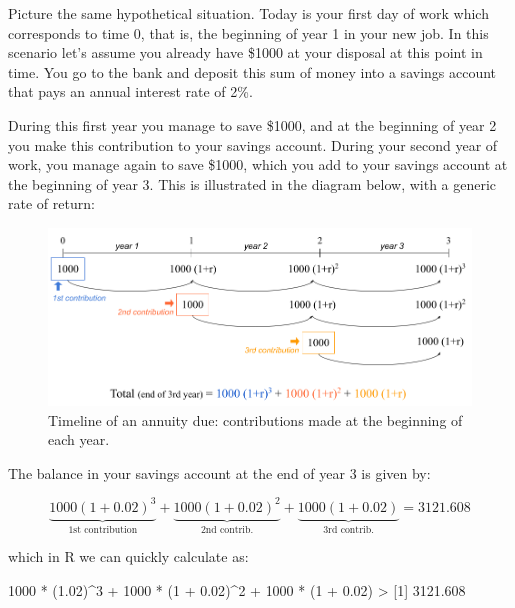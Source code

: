 \documentclass[
]{book}
\newenvironment{Shaded}{\begin{snugshade}}{\end{snugshade}}
\newcommand{\DecValTok}[1]{\textcolor[rgb]{0.00,0.00,0.81}{#1}}
\newcommand{\FloatTok}[1]{\textcolor[rgb]{0.00,0.00,0.81}{#1}}
\newcommand{\NormalTok}[1]{#1}
\newcommand{\SpecialCharTok}[1]{\textcolor[rgb]{0.00,0.00,0.00}{#1}}
\begin{document}
Picture the same hypothetical situation. Today is your first day of work
which corresponds to time 0, that is, the beginning of year 1 in your new job.
In this scenario let's assume you already have \$1000 at your disposal
at this point in time. You go to the bank and deposit this sum of money into a
savings account that pays an annual interest rate of 2\%.

During this first year you manage to save \$1000, and at the beginning of year 2
you make this contribution to your savings account. During your second year of
work, you manage again to save \$1000, which you add to your savings account at
the beginning of year 3. This is illustrated in the diagram below, with a
generic rate of return:

\begin{figure}

{\centering \includegraphics[width=0.95\linewidth]{images/conditionals/timeline-due-annuity} 

}

\caption{Timeline of an annuity due: contributions made at the beginning of each year.}\label{fig:unnamed-chunk-258}
\end{figure}

The balance in your savings account at the end of year 3 is given by:

\[
\underbrace{1000 (1 + 0.02)^3}_{\text{1st contribution}} + \underbrace{1000 (1 + 0.02)^2}_{\text{2nd contrib.}} + \underbrace{1000 (1 + 0.02)}_{\text{3rd contrib.}} = 3121.608
\]

which in R we can quickly calculate as:

\begin{Shaded}
\begin{Highlighting}[]
\DecValTok{1000} \SpecialCharTok{*}\NormalTok{ (}\FloatTok{1.02}\NormalTok{)}\SpecialCharTok{\^{}}\DecValTok{3} \SpecialCharTok{+} \DecValTok{1000} \SpecialCharTok{*}\NormalTok{ (}\DecValTok{1} \SpecialCharTok{+} \FloatTok{0.02}\NormalTok{)}\SpecialCharTok{\^{}}\DecValTok{2} \SpecialCharTok{+} \DecValTok{1000} \SpecialCharTok{*}\NormalTok{ (}\DecValTok{1} \SpecialCharTok{+} \FloatTok{0.02}\NormalTok{)}
\SpecialCharTok{\textgreater{}}\NormalTok{ [}\DecValTok{1}\NormalTok{] }\FloatTok{3121.608}
\end{Highlighting}
\end{Shaded}
\end{document}
